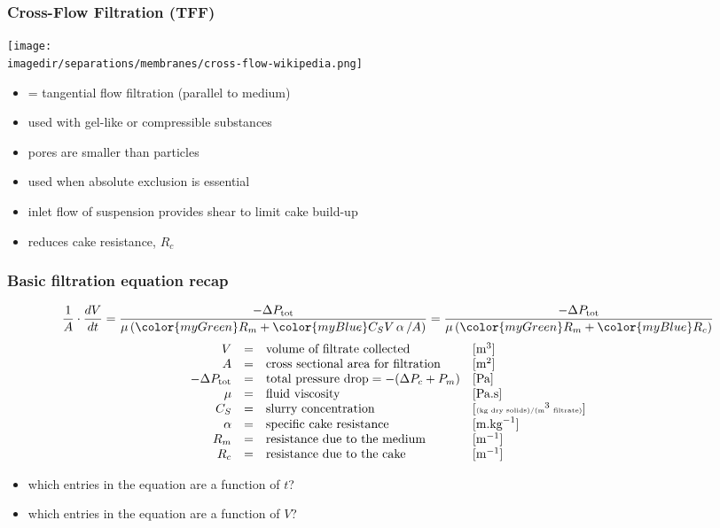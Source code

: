 \begin{frame}\frametitle{Cross-Flow Filtration (TFF)}
	\begin{center}
		\texttt{[image: \\imagedir/separations/membranes/cross-flow-wikipedia.png]}
	\end{center}
	\begin{itemize}
		\item	{\color{purple}{TFF}} = tangential flow filtration (parallel to medium)
		\item	used with gel-like or compressible substances
		\item	pores are smaller than particles
		\item	used when absolute exclusion is essential
		\item	inlet flow of suspension provides shear to limit cake build-up
		\item	reduces cake resistance, $R_c$
	\end{itemize}
\end{frame}

\begin{frame}\frametitle{Basic filtration equation recap}
	\[\dfrac{1}{A} \cdot \dfrac{dV}{dt} = \dfrac{-\Delta P_\text{tot}}{\mu \left({\color{myGreen}R_m} + {\color{myBlue}C_S V  \, \mathbf{ \alpha}\, / A} \right)} =  \dfrac{-\Delta P_\text{tot}}{\mu \left({\color{myGreen}R_m} + {\color{myBlue}R_c} \right)}
	\]
	\vspace{12pt}
	\[
		\begin{array}{rcll}
			V		&=& \text{volume of filtrate collected} 		&[\text{m}^3]\\
			A		&=& \text{cross sectional area for filtration}  &[\text{m}^2]\\
			-\Delta P_\text{tot}	&=& \text{total pressure drop} = -(\Delta P_c + P_m)	&[\text{Pa}]\\
			\mu 	&=& \text{fluid viscosity}  					&[\text{Pa.s}]\\
			C_S  	&=& \text{slurry concentration}					&[{\tiny \text{(kg dry solids)/(m}^{3}\text{ filtrate)}}]\\
			\alpha	&=& \text{specific cake resistance} 			&[\text{m.kg}^{-1}]\\
			R_m  &=& \text{resistance due to the medium}			&[\text{m}^{-1}]\\
			R_c  &=& \text{resistance due to the cake}				&[\text{m}^{-1}]
		\end{array}
	\]
	\begin{itemize}
		\item	which entries in the equation are a function of $t$?
		\item	which entries in the equation are a function of $V$?
	\end{itemize}
\end{frame}

